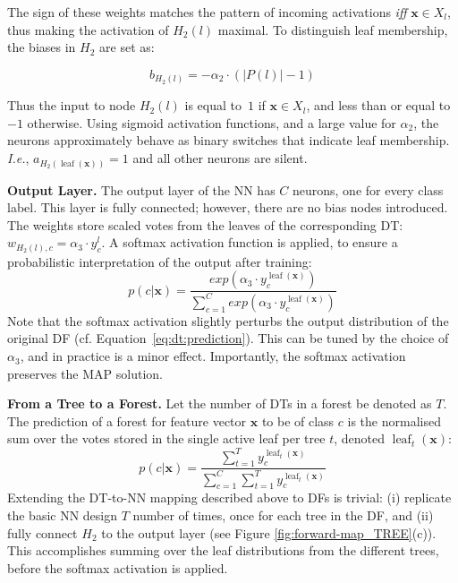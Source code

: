 \documentclass[twocolumn]{svjour3}
\DeclareMathOperator{\leaf}{leaf}
\begin{document}
\vspace{-6pt}
\noindent The sign of these weights matches the pattern of incoming activations \emph{iff} $\textbf{x} \in X_l$, thus making the activation of $H_2(l)$ maximal.
To distinguish leaf membership, the biases in $H_2$ are set as:
\vspace{-6pt}

{
\small
\begin{equation}
b_{H_2(l)} = -\alpha_2 \cdot ( |P(l)| - 1) 
\end{equation}
}

\vspace{-6pt}
\noindent Thus the input to node $H_2(l)$ is equal to~$1$ if $\mathbf{x} \in X_l$, and less than or equal to $-1$ otherwise. 
Using sigmoid activation functions, and a large value for $\alpha_2$, the neurons approximately behave as binary switches that indicate leaf membership. \emph{I.e.}, $a_{H_2(\leaf(\mathbf{x}))} = 1$ and all other neurons are silent.

\textbf{Output Layer. } The output layer of the NN has $C$ neurons, one for every class label.  This layer is fully connected; however, there are no bias nodes introduced. The weights store scaled votes from the leaves of the corresponding DT: $w_{H_2(l),c} = \alpha_3 \cdot y^l_c$. A softmax activation function is applied, to ensure a probabilistic interpretation of the output after training:
\begin{equation}
p(c | \mathbf{x}) = \frac{exp(\alpha_3 \cdot y^{\leaf(\mathbf{x})}_c)}{\sum_{c=1}^{C} exp(\alpha_3 \cdot y^{\leaf(\mathbf{x})}_c)}
\end{equation} 
Note that the softmax activation slightly perturbs the output distribution of the original DF (cf. Equation~\ref{eq:dt:prediction}).
This can be tuned by the choice of $\alpha_3$, and in practice is a minor effect.
Importantly, the softmax activation preserves the MAP solution.

\textbf{From a Tree to a Forest. } 
Let the number of DTs in a forest be denoted as $T$. 
The prediction of a forest for feature vector $\mathbf{x}$ to be of class $c$ is the normalised sum over the votes stored in the single active leaf per tree $t$, denoted $\leaf_t(\mathbf{x})$:
\begin{equation}
p(c | \mathbf{x}) = \frac{\sum_{t=1}^{T} y^{\leaf_t(\mathbf{x})}_c}{\sum_{c=1}^{C}\sum_{t=1}^{T} y^{\leaf_t(\mathbf{x})}_c}
\label{eq:rf:prediction}
\end{equation} 
Extending the DT-to-NN mapping described above to DFs is trivial: (i) replicate the basic NN design $T$ number of times, once for each tree in the DF, and (ii) fully connect $H_2$ to the output layer
(see Figure \ref{fig:forward-map_TREE}(c)).
This accomplishes summing over the leaf distributions from the different trees, before the softmax activation is applied.
\end{document}

